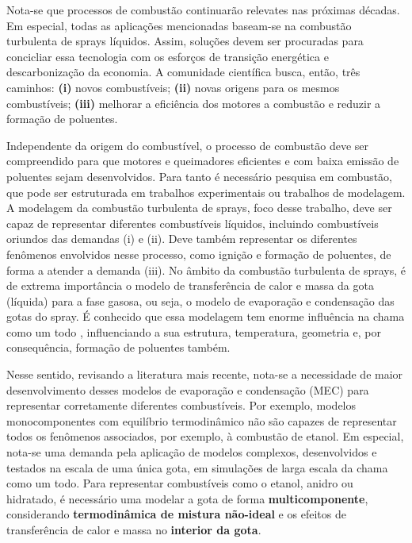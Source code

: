 Nota-se que processos de combustão continuarão relevates nas próximas décadas.
Em especial, todas as aplicações mencionadas baseam-se na combustão turbulenta de sprays líquidos.
Assim, soluções devem ser procuradas para concicliar essa tecnologia com os esforços de transição energética e descarbonização da economia.
A comunidade científica busca, então, três caminhos: \textbf{(i)} novos combustíveis; \textbf{(ii)} novas origens para os mesmos combustíveis; \textbf{(iii)} melhorar a eficiência dos motores a combustão e reduzir a formação de poluentes.

Independente da origem do combustível, o processo de combustão deve ser compreendido para que motores e queimadores eficientes e com baixa emissão de poluentes sejam desenvolvidos.
Para tanto é necessário pesquisa em combustão, que pode ser estruturada em trabalhos experimentais ou trabalhos de modelagem.
A modelagem da combustão turbulenta de sprays, foco desse trabalho, deve ser capaz de representar diferentes combustíveis líquidos, incluindo combustíveis oriundos das demandas (i) e (ii).
Deve também representar os diferentes fenômenos envolvidos nesse processo, como ignição e formação de poluentes, de forma a atender a demanda (iii).
No âmbito da combustão turbulenta de sprays, é de extrema importância o modelo de transferência de calor e massa da gota (líquida) para a fase gasosa, ou seja, o modelo de evaporação e condensação das gotas do spray.
É conhecido que essa modelagem tem enorme influência na chama como um todo \cite{JennyB2012}, influenciando a sua estrutura, temperatura, geometria e, por consequência, formação de poluentes também.

Nesse sentido, revisando a literatura mais recente, nota-se a necessidade de maior desenvolvimento desses modelos de evaporação e condensação (MEC) para representar corretamente diferentes combustíveis.
Por exemplo, modelos monocomponentes com equilíbrio termodinâmico não são capazes de representar todos os fenômenos associados, por exemplo, à combustão de etanol.
Em especial, nota-se uma demanda pela aplicação de modelos complexos, desenvolvidos e testados na escala de uma única gota, em simulações de larga escala da chama como um todo.
Para representar combustíveis como o etanol, anidro ou hidratado, é necessário uma modelar a gota de forma \textbf{multicomponente}, considerando \textbf{termodinâmica de mistura não-ideal} e os efeitos de transferência de calor e massa no \textbf{interior da gota}.

